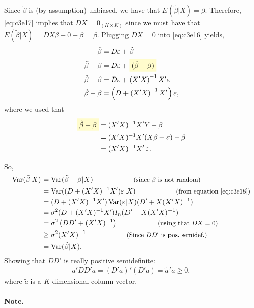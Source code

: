 \documentclass[
  14pt,
]{memoir}
\DeclareMathOperator{\eps}{\varepsilon}
\DeclareMathOperator{\V}{\operatorname{Var}}
\newcommand{\mathcolorbox}[2]{\colorbox{#1}{$\displaystyle #2$}}
\begin{document}
Since \(\tilde{\beta}\) is (by assumption) unbiased, we have that
\(E(\tilde{\beta}|X)={\beta}\). Therefore, \eqref{eq:c3e17} implies that \(DX=0_{(K\times K)}\) since we must have that \(E(\tilde{\beta}|X)=DX{\beta}+0+{\beta}=\beta\). Plugging \(DX=0\) into \eqref{eq:c3e16} yields,
\begin{align}
\tilde{\beta}&=D{\varepsilon} + \hat{\beta}\nonumber\\
\tilde{\beta}-{\beta}&=D{\varepsilon} + \mathcolorbox{yellow!20}{(\hat{\beta}-{\beta})}\nonumber\\
\tilde{\beta}-{\beta}&=D{\varepsilon} + \left(X'X\right)^{-1}X'{\varepsilon}\nonumber\\
\tilde{\beta}-{\beta}&=\left(D + \left(X'X\right)^{-1}X'\right){\varepsilon},\label{eq:c3e18}
\end{align}
where we used that
\begin{align*}
\mathcolorbox{yellow!20}{\hat\beta-\beta}&=(X'X)^{-1}X'Y-\beta\\
&=(X'X)^{-1}X'(X\beta+\eps)-\beta\\
&=(X'X)^{-1}X'\eps.
\end{align*}

So,
\begin{align*}
  \V(\tilde{\beta}|X)
  &= \V(\tilde{\beta}-{\beta}|X)\hspace*{2cm}{\small\text{(since $\beta$ is not random)}}\\
  &= \V((D + (X'X)^{-1}X'){\varepsilon}|X)\hspace*{2cm}{\small\text{(from equation \eqref{eq:c3e18})}}\\
  &= (D + (X'X)^{-1}X')\V({\varepsilon}|X)(D' + X(X'X)^{-1})\\
  &= \sigma^2(D + (X'X)^{-1}X')I_n(D' + X(X'X)^{-1})\\
  &= \sigma^2\left(DD'+(X'X)^{-1}\right)\hspace*{2cm}{\small\text{(using that $DX=0$)}} \\
  &\geq\sigma^2(X'X)^{-1} \hspace*{2cm}{\small\text{(Since $DD'$ is pos.~semidef.)}}\\
  &= \V(\hat{\beta}|X). 
\end{align*}
Showing that \(DD'\) is really positive semidefinite:
\begin{align*}
a'DD'a=(D'a)'(D'a)=\tilde{a}'\tilde{a}\geq 0,
\end{align*}
where \(\tilde{a}\) is a \(K\) dimensional column-vector.

\paragraph*{Note.}
\end{document}
